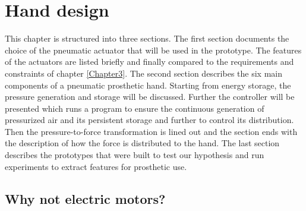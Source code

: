 \documentclass[main]{subfiles}
\begin{document}
\chapter{Hand design} %

\label{Chapter4} %


This chapter is structured into three sections. The first section documents the choice of the pneumatic actuator that will be used in the prototype. The features of the actuators are listed briefly and finally compared to the requirements and constraints of chapter \ref{Chapter3}.  The second section describes the six main components of a pneumatic prosthetic hand. Starting from energy storage, the pressure generation and storage will be discussed. Further the controller will be presented which runs a program to ensure the continuous generation of pressurized air and its persistent storage and further to control its distribution. Then the pressure-to-force transformation is lined out and the section ends with the description of how the force is distributed to the hand. The last section describes the prototypes that were built to test our hypothesis and run experiments to extract features for prosthetic use.

\section{Why not electric motors?}
\end{document}

